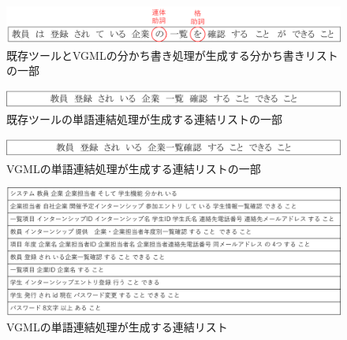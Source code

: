 \begin{figure}[t]
    \begin{center}
        \includegraphics[width=1.0\columnwidth]{image/exis_wakati.png}
        \caption{既存ツールとVGMLの分かち書き処理が生成する分かち書きリストの一部}
        \label{fig:exis_wakati}
    \end{center}
\end{figure}

\begin{figure}[p]
    \begin{center}
        \includegraphics[width=1.0\columnwidth]{image/exis_connect.png}
        \caption{既存ツールの単語連結処理が生成する連結リストの一部}
        \label{fig:exis_connect}
    \end{center}
\end{figure}

\begin{figure}[p]
    \begin{center}
        \includegraphics[width=1.0\columnwidth]{image/vgml_connect.png}
        \caption{VGMLの単語連結処理が生成する連結リストの一部}
        \label{fig:vgml_connect}
    \end{center}
\end{figure}

\begin{figure}[p]
    \begin{center}
        \includegraphics[width=1.0\columnwidth]{image/vgml_connect_list.png}
        \caption{VGMLの単語連結処理が生成する連結リスト}
        \label{fig:vgml_connect_list}
    \end{center}
\end{figure}

